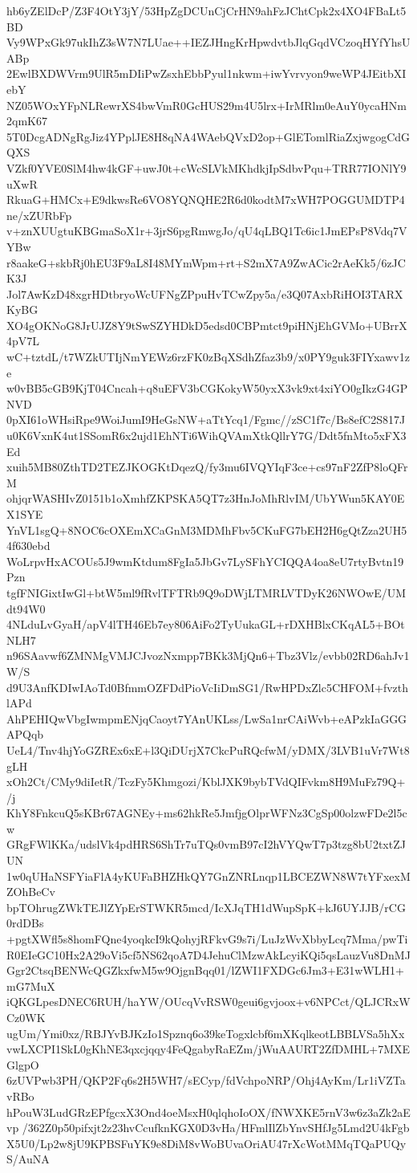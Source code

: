 hb6yZElDcP/Z3F4OtY3jY/53HpZgDCUnCjCrHN9ahFzJChtCpk2x4XO4FBaLt5BD
Vy9WPxGk97ukIhZ3sW7N7LUae++IEZJHngKrHpwdvtbJlqGqdVCzoqHYfYhsUABp
2EwlBXDWVrm9UlR5mDIiPwZsxhEbbPyul1nkwm+iwYvrvyon9weWP4JEitbXIebY
NZ05WOxYFpNLRewrXS4bwVmR0GcHUS29m4U5lrx+IrMRlm0eAuY0ycaHNm2qmK67
5T0DcgADNgRgJiz4YPplJE8H8qNA4WAebQVxD2op+GlETomlRiaZxjwgogCdGQXS
VZkf0YVE0SlM4hw4kGF+uwJ0t+cWcSLVkMKhdkjIpSdbvPqu+TRR77IONlY9uXwR
RkuaG+HMCx+E9dkwsRe6VO8YQNQHE2R6d0kodtM7xWH7POGGUMDTP4ne/xZURbFp
v+znXUUgtuKBGmaSoX1r+3jrS6pgRmwgJo/qU4qLBQ1Tc6ic1JmEPsP8Vdq7VYBw
r8aakeG+skbRj0hEU3F9aL8I48MYmWpm+rt+S2mX7A9ZwACic2rAeKk5/6zJCK3J
Jol7AwKzD48xgrHDtbryoWcUFNgZPpuHvTCwZpy5a/e3Q07AxbRiHOI3TARXKyBG
XO4gOKNoG8JrUJZ8Y9tSwSZYHDkD5edsd0CBPmtct9piHNjEhGVMo+UBrrX4pV7L
wC+tztdL/t7WZkUTIjNmYEWz6rzFK0zBqXSdhZfaz3b9/x0PY9guk3FIYxawv1ze
w0vBB5cGB9KjT04Cncah+q8uEFV3bCGKokyW50yxX3vk9xt4xiYO0gIkzG4GPNVD
0pXI61oWHsiRpe9WoiJumI9HeGsNW+aTtYcq1/Fgmc//zSC1f7c/Bs8efC2S817J
u0K6VxnK4ut1SSomR6x2ujd1EhNTi6WihQVAmXtkQllrY7G/Ddt5fnMto5xFX3Ed
xuih5MB80ZthTD2TEZJKOGKtDqezQ/fy3mu6IVQYIqF3ce+cs97nF2ZfP8loQFrM
ohjqrWASHIvZ0151b1oXmhfZKPSKA5QT7z3HnJoMhRlvIM/UbYWun5KAY0EX1SYE
YnVL1sgQ+8NOC6cOXEmXCaGnM3MDMhFbv5CKuFG7bEH2H6gQtZza2UH54f630ebd
WoLrpvHxACOUs5J9wmKtdum8FgIa5JbGv7LySFhYCIQQA4oa8eU7rtyBvtn19Pzn
tgfFNIGixtIwGl+btW5ml9fRvlTFTRb9Q9oDWjLTMRLVTDyK26NWOwE/UMdt94W0
4NLduLvGyaH/apV4lTH46Eb7ey806AiFo2TyUukaGL+rDXHBlxCKqAL5+BOtNLH7
n96SAavwf6ZMNMgVMJCJvozNxmpp7BKk3MjQn6+Tbz3Vlz/evbb02RD6ahJv1W/S
d9U3AnfKDIwIAoTd0BfmmOZFDdPioVcIiDmSG1/RwHPDxZlc5CHFOM+fvzthlAPd
AhPEHIQwVbgIwmpmENjqCaoyt7YAnUKLss/LwSa1nrCAiWvb+eAPzkIaGGGAPQqb
UeL4/Tnv4hjYoGZREx6xE+l3QiDUrjX7CkcPuRQcfwM/yDMX/3LVB1uVr7Wt8gLH
xOh2Ct/CMy9diIetR/TczFy5Khmgozi/KblJXK9bybTVdQIFvkm8H9MuFz79Q+/j
KhY8FnkcuQ5sKBr67AGNEy+ms62hkRe5JmfjgOlprWFNz3CgSp00olzwFDe2l5cw
GRgFWlKKa/udslVk4pdHRS6ShTr7uTQs0vmB97cI2hVYQwT7p3tzg8bU2txtZJUN
1w0qUHaNSFYiaFlA4yKUFaBHZHkQY7GnZNRLnqp1LBCEZWN8W7tYFxexMZOhBeCv
bpTOhrugZWkTEJlZYpErSTWKR5mcd/IcXJqTH1dWupSpK+kJ6UYJJB/rCG0rdDBs
+pgtXWfl5s8homFQne4yoqkcI9kQohyjRFkvG9s7i/LuJzWvXbbyLcq7Mma/pwTi
R0EIeGC10Hx2A29oVi5cf5NS62qoA7D4JehuClMzwAkLcyiKQi5qsLauzVu8DnMJ
Ggr2CtsqBENWcQGZkxfwM5w9OjgnBqq01/lZWI1FXDGc6Jm3+E31wWLH1+mG7MuX
iQKGLpesDNEC6RUH/haYW/OUcqVvRSW0geui6gvjoox+v6NPCct/QLJCRxWCz0WK
ugUm/Ymi0xz/RBJYvBJKzIo1Spznq6o39keTogxlcbf6mXKqlkeotLBBLVSa5hXx
vwLXCPI1SkL0gKhNE3qxcjqqy4FeQgabyRaEZm/jWuAAURT2ZfDMHL+7MXEGlgpO
6zUVPwb3PH/QKP2Fq6s2H5WH7/sECyp/fdVchpoNRP/Ohj4AyKm/Lr1iVZTavRBo
hPouW3LudGRzEPfgcxX3Ond4oeMsxH0qlqhoIoOX/fNWXKE5rnV3w6z3aZk2aEvp
/362Z0p50pifxjt2z23hvCcufknKGX0D3vHa/HFmlIlZbYnvSHfJg5Lmd2U4kFgb
X5U0/Lp2w8jU9KPBSFuYK9e8DiM8vWoBUvaOriAU47rXcWotMMqTQaPUQyS/AuNA
